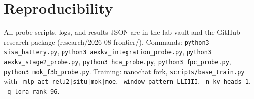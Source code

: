 \documentclass[11pt]{article}
\begin{document}
\appendix
\section{Reproducibility}
All probe scripts, logs, and results JSON are in the lab vault and the
GitHub research package (research/2026-08-frontier/). Commands:
\texttt{python3 sisa\_battery.py}, \texttt{python3 aexkv\_integration\_probe.py},
\texttt{python3 aexkv\_stage2\_probe.py}, \texttt{python3 hca\_probe.py},
\texttt{python3 fpc\_probe.py}, \texttt{python3 mok\_f3b\_probe.py}.
Training: nanochat fork, \texttt{scripts/base\_train.py} with
\texttt{--mlp-act relu2|situ|mok|moe}, \texttt{--window-pattern LLIIII},
\texttt{--n-kv-heads 1}, \texttt{--q-lora-rank 96}.
\end{document}
